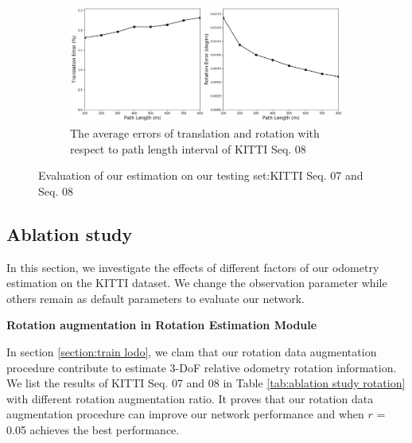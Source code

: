 \documentclass[sigconf]{acmart}
\begin{document}
\begin{figure}[h]
     \begin{subfigure}[b]{0.4\textwidth}
         \centering
         \includegraphics[width=\textwidth]{Figures/error8.png}
         \caption{The average errors of translation and rotation with respect to path length interval of KITTI Seq. 08}
         \label{fig:evaluation c}
     \end{subfigure}
     
        \caption{Evaluation of our estimation on our testing set:KITTI Seq. 07 and Seq. 08}
        \label{fig:evaluation}
\end{figure}


\subsection{Ablation study}
In this section, we investigate the effects of different factors of our odometry estimation on the KITTI dataset. We change the observation parameter while others remain as default parameters to evaluate our network.

\noindent
 \textbf{Rotation augmentation in Rotation Estimation Module}

In section \ref{section:train lodo}, we clam that our rotation data augmentation procedure contribute to estimate 3-DoF relative odometry rotation information. We list the results of KITTI Seq. 07 and 08 in Table \ref{tab:ablation study rotation} with different rotation augmentation ratio. It proves that our rotation data augmentation procedure can improve our network performance and when $r$ = 0.05 achieves the best performance. 
\end{document}
